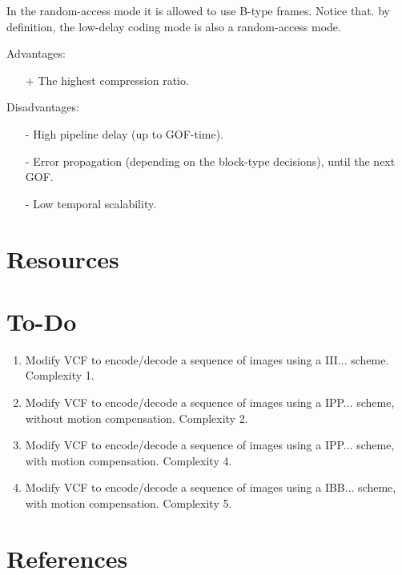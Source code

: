 In the random-access mode it is allowed to use B-type frames.
Notice that. by definition, the low-delay coding mode is also a
random-access mode.

Advantages:
\begin{itemize}
\item [+] The highest compression ratio.
\end{itemize}

Disadvantages:
\begin{enumerate}
\item [-] High pipeline delay (up to GOF-time).
\item [-] Error propagation (depending on the block-type decisions),
  until the next GOF.
\item [-] Low temporal scalability.
\end{enumerate}

\section{Resources}

\section{To-Do}

\begin{enumerate}
\item Modify VCF to encode/decode a sequence of images using a
  III... scheme. Complexity 1.
\item Modify VCF to encode/decode a sequence of images using a
  IPP... scheme, without motion compensation. Complexity 2.
\item Modify VCF to encode/decode a sequence of images using a
  IPP... scheme, with motion compensation. Complexity 4.
\item Modify VCF to encode/decode a sequence of images using a
  IBB... scheme, with motion compensation. Complexity 5.
\end{enumerate}

  
\section{References}

\renewcommand{\addcontentsline}[3]{}%


